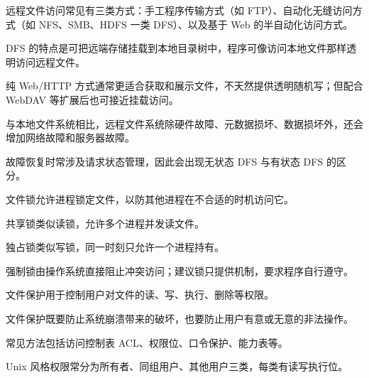 \begin{points}
  \item 远程文件访问常见有三类方式：手工程序传输方式（如 FTP）、自动化无缝访问方式（如 NFS、SMB、HDFS 一类 DFS）、以及基于 Web 的半自动化访问方式。
  \item DFS 的特点是可把远端存储挂载到本地目录树中，程序可像访问本地文件那样透明访问远程文件。
  \item 纯 Web/HTTP 方式通常更适合获取和展示文件，不天然提供透明随机写；但配合 WebDAV 等扩展后也可接近挂载访问。
  \item 与本地文件系统相比，远程文件系统除硬件故障、元数据损坏、数据损坏外，还会增加网络故障和服务器故障。
  \item 故障恢复时常涉及请求状态管理，因此会出现无状态 DFS 与有状态 DFS 的区分。
\end{points}


\begin{points}
  \item 文件锁允许进程锁定文件，以防其他进程在不合适的时机访问它。
  \item 共享锁类似读锁，允许多个进程并发读文件。
  \item 独占锁类似写锁，同一时刻只允许一个进程持有。
  \item 强制锁由操作系统直接阻止冲突访问；建议锁只提供机制，要求程序自行遵守。
\end{points}


\begin{points}
  \item 文件保护用于控制用户对文件的读、写、执行、删除等权限。
  \item 文件保护既要防止系统崩溃带来的破坏，也要防止用户有意或无意的非法操作。
  \item 常见方法包括访问控制表 ACL、权限位、口令保护、能力表等。
  \item Unix 风格权限常分为所有者、同组用户、其他用户三类，每类有读写执行位。
\end{points}


